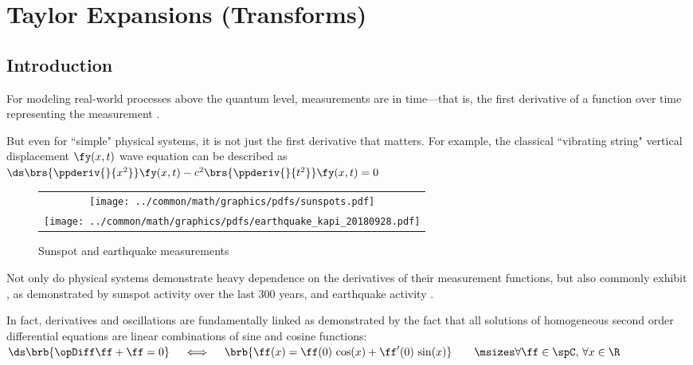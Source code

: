 \chapter{Taylor Expansions (Transforms)}
\label{chp:taylor}
\section{Introduction}
For modeling real-world processes above the quantum level, measurements are  in time---that is,
the first derivative of a function over time representing the measurement .

But even for ``simple" physical systems, it is not just the first derivative that matters.
For example, the classical ``vibrating string" vertical displacement $\fy(x,t)$ wave equation can be described as\footnotemark
        \\\indentx$\ds\brs{\ppderiv{ }{x^2}}\fy(x,t) - c^2\brs{\ppderiv{ }{t^2}}\fy(x,t) = 0$

\begin{figure}
  \centering
  \begin{tabular}{c}
    \texttt{[image: ../common/math/graphics/pdfs/sunspots.pdf]}\\
    \texttt{[image: ../common/math/graphics/pdfs/earthquake\_kapi\_20180928.pdf]}
  \end{tabular}
  \caption{Sunspot and earthquake measurements\label{fig:sunspot}}
\end{figure}
Not only do physical systems demonstrate heavy dependence on the derivatives of their measurement functions,
but also commonly exhibit , as demonstrated by sunspot activity over the last 300 years, and
earthquake activity .

In fact, derivatives and oscillations are fundamentally linked
as demonstrated by the fact that 
all solutions of homogeneous second order differential equations
        are linear combinations of sine and cosine functions:
        \\\indentx$\ds  \brb{\opDiff\ff + \ff=0}
  \quad\iff\quad
  \brb{\ff(x) = \ff(0)\,\cos(x) + \ff^\prime(0)\,\sin(x)}
  \qquad\msizes\forall\ff\in\spC,\,\forall x\in\R$

